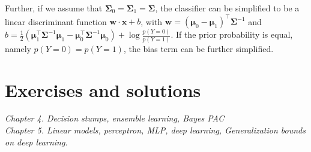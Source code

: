 \documentclass{article}
\begin{document}
	Further, if we assume that $\bm{\Sigma}_0=\bm{\Sigma}_1=\bm{\Sigma}$, the classifier can be simplified to be a linear discriminant function $\bm{w}\cdot\bm{x}+b$, with $\bm{w}=(\bm{\mu}_0 - \bm{\mu}_1)^\top\bm{\Sigma}^{-1}$ and $b=\frac{1}{2} (\bm{\mu}_1^\top\bm{\Sigma}^{-1}\bm{\mu}_1 - \bm{\mu}_0^\top\bm{\Sigma}^{-1}\bm{\mu}_0 ) + \log \frac{p(Y=0)}{p(Y=1)}$. If the prior probability is equal, namely $p(Y=0)=p(Y=1)$, the bias term can be further simplified.
	
	
	
	
\section{Exercises and solutions}

\textit{
	  Chapter 4. Decision stumps, ensemble learning, Bayes PAC \\
      Chapter 5. Linear models, perceptron, MLP, deep learning, Generalization bounds on deep learning.}
\end{document}
